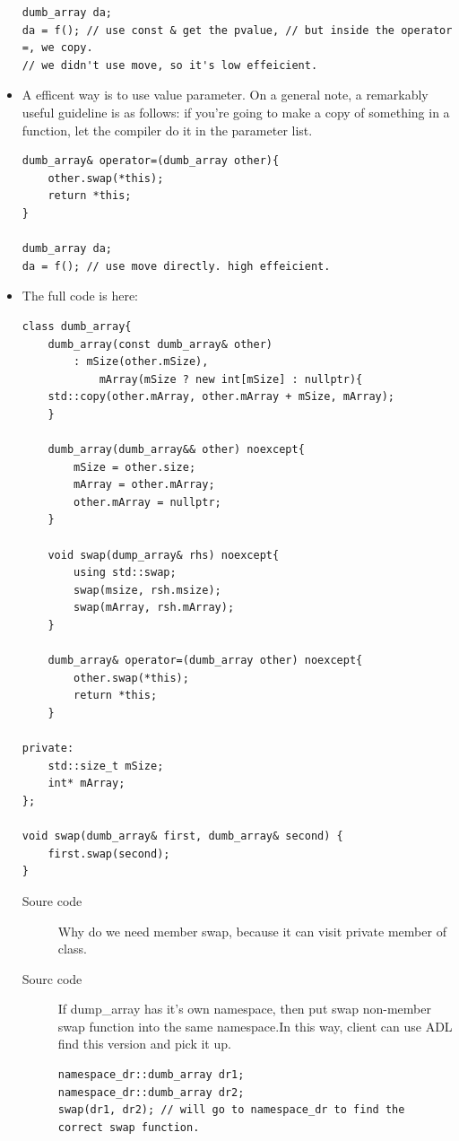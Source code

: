 \documentclass[a4paper,11pt,twoside]{book}
\begin{document}
\begin{itemize}
\begin{lstlisting}[numbers=none]
dumb_array da;
da = f(); // use const & get the pvalue, // but inside the operator =, we copy. 
// we didn't use move, so it's low effeicient.	
\end{lstlisting}
	
	\item  A efficent way is to use value parameter. On a general note, a remarkably useful guideline is as follows: if you're going to make a copy of something in a function, let the compiler do it in the parameter list.
	
\begin{lstlisting}[numbers=none]
dumb_array& operator=(dumb_array other){
	other.swap(*this); 
	return *this;
}	

dumb_array da;
da = f(); // use move directly. high effeicient.
\end{lstlisting}
	

\item The full code is here:
\begin{lstlisting}[numbers=none]
class dumb_array{
	dumb_array(const dumb_array& other)
		: mSize(other.mSize),
			mArray(mSize ? new int[mSize] : nullptr){
	std::copy(other.mArray, other.mArray + mSize, mArray);
	}

	dumb_array(dumb_array&& other) noexcept{
		mSize = other.size;
		mArray = other.mArray;
		other.mArray = nullptr;
	}

	void swap(dump_array& rhs) noexcept{
		using std::swap;
		swap(msize, rsh.msize);
		swap(mArray, rsh.mArray);
	}
	
	dumb_array& operator=(dumb_array other) noexcept{
		other.swap(*this); 
		return *this;
	}

private:
	std::size_t mSize;
	int* mArray;
};

void swap(dumb_array& first, dumb_array& second) {
	first.swap(second);
}
\end{lstlisting}
\begin{description}
    \item[Soure code] Why do we need member swap, because it can visit private member of class.

    \item[Sourc code] If dump\_array has it's own namespace, then put swap non-member swap function into the same namespace.In this way, client can use ADL find this version and pick it up.

\begin{lstlisting}
namespace_dr::dumb_array dr1;
namespace_dr::dumb_array dr2;
swap(dr1, dr2); // will go to namespace_dr to find the correct swap function.
\end{lstlisting}


\end{description}
\end{itemize}
\end{document}
